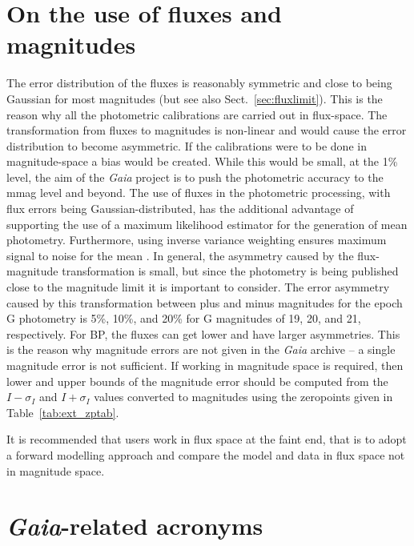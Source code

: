 \documentclass{aa}
\newcommand{\gaia}{\textit{Gaia}\xspace}
\newcommand{\secname}{Sect.}
\newcommand{\secref}[1]{\secname~\ref{sec:#1}}
\newcommand{\tabref}[1]{Table~\ref{tab:#1}}
\begin{document}
\begin{appendix}
\section{On the use of fluxes and magnitudes}\label{sec:MagFlux}
The error distribution of the fluxes is reasonably symmetric and close to being Gaussian for most magnitudes (but see also \secref{fluxlimit}). This is the reason why all the photometric calibrations are carried out in flux-space. The transformation from fluxes to magnitudes is non-linear and would cause the error distribution to become asymmetric. If the calibrations were to be done in magnitude-space a bias would be created. While this would be small, at the 1\% level, the aim of the \gaia project is to push the photometric accuracy to the mmag level and beyond.
%
The use of fluxes in the photometric processing, with flux errors being Gaussian-distributed, has the additional advantage of supporting the use of a maximum likelihood estimator for the generation of mean photometry. Furthermore, using inverse variance weighting ensures maximum signal to noise for the mean \citep[see e.g.][]{lupton1993statistics}.
%
In general, the asymmetry caused by the flux-magnitude transformation is small, but since the photometry is being published close to the magnitude limit it is important to consider. The error asymmetry caused by this transformation between plus and minus magnitudes for the epoch G photometry is 5\%, 10\%, and 20\% for G magnitudes of 19, 20, and 21, respectively. For BP, the fluxes can get lower and have larger asymmetries. This is the reason why magnitude errors are not given in the \gaia archive -- a single magnitude error is not sufficient. If working in magnitude space is required, then lower and upper bounds of the magnitude error should be computed from the $I-\sigma_I$ and $I+\sigma_I$ values converted to magnitudes using the zeropoints given in \tabref{ext_zptab}.

It is recommended that users work in flux space at the faint end,  that is to adopt a forward modelling approach and compare the model and data in flux space not in magnitude space.


\section{\gaia-related acronyms}\label{sec:acronyms}


\end{appendix}
\end{document}
